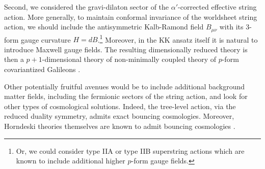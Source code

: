 \documentclass[amsmath,amssymb,11pt]{article}
\begin{document}
Second, we considered the gravi-dilaton sector of the $\alpha'$-corrected effective string action. More generally, to maintain conformal invariance of the worldsheet string action, we should include the antisymmetric Kalb-Ramond field $B_{\mu\nu}$ with its 3-form gauge curvature $H=dB$.\footnote{Or, we could consider  type IIA or type IIB superstring actions which are known to include additional higher $p$-form gauge fields.} Moreover, in the KK ansatz itself it is natural to introduce Maxwell gauge fields. The resulting dimensionally reduced theory is then a $p+1$-dimensional theory of non-minimally coupled theory of $p$-form covariantized Galileons \cite{Deffayet:2010zh}. %

Other potentially fruitful avenues would be to include additional background matter fields, including the fermionic sectors of the string action, and look for other types of cosmological solutions. Indeed, the tree-level action, via the reduced duality symmetry, admits exact bouncing cosmologies. Moreover, Horndeski theories themselves are known to admit bouncing cosmologies \cite{Qiu:2011cy,Easson:2011zy,Rubakov13-1,Ijjas16-1}. 
\end{document}
